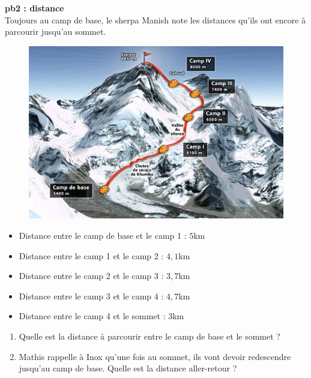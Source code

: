 \textbf{pb2 : distance} \\
 
Toujours au camp de base, le sherpa Manish note les distances qu'ils ont encore à parcourir jusqu'au sommet. 

\begin{multicols}{2}

\begin{figure}[H]
  \centering
  \includegraphics[width=0.8\linewidth]{5x1-calcul-numerique/camp.jpg}
\end{figure} \columnbreak

\begin{itemize}[label={$\bullet$}]
  \item Distance entre le camp de base et le camp 1 : $5$km \\
  \item Distance entre le camp 1 et le camp 2 : $4,1$km \\
  \item Distance entre le camp 2 et le camp 3 : $3,7$km \\
  \item Distance entre le camp 3 et le camp 4 : $4,7$km \\
  \item Distance entre le camp 4 et le sommet : $3$km \\
\end{itemize} 

\end{multicols}

\begin{enumerate}
  \item[1.] Quelle est la distance à parcourir entre le camp de base et le sommet ?
  \item[2.] Mathis rappelle à Inox qu'une fois au sommet, ils vont devoir redescendre jusqu'au camp de base. Quelle est la distance aller-retour ? \\
\end{enumerate}

